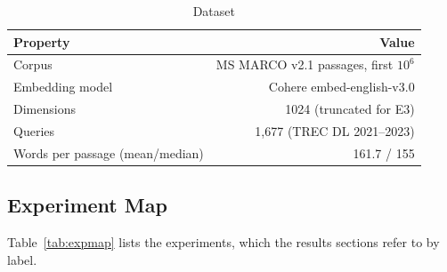 \documentclass[sigconf, nonacm]{acmart}
\begin{document}
\begin{table}[h]
  \caption{Dataset}
  \label{tab:dataset}
  \small
  \begin{tabular}{lr}
    \toprule
    Property & Value \\
    \midrule
    Corpus & MS MARCO v2.1 passages, first $10^6$ \\
    Embedding model & Cohere embed-english-v3.0 \\
    Dimensions & 1024 (truncated for E3) \\
    Queries & 1{,}677 (TREC DL 2021--2023) \\
    Words per passage (mean/median) & 161.7 / 155 \\
    \bottomrule
  \end{tabular}
\end{table}

\subsection{Experiment Map}

Table~\ref{tab:expmap} lists the experiments, which the results sections refer to by
label.
\end{document}

